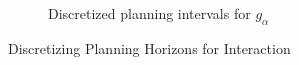 \begin{figure}[h!]
\begin{subfigure}[t]{0.5\textwidth}
\begin{tikzpicture}
\end{tikzpicture}
  \caption{Discretized planning intervals for $g_{\alpha}$}
\end{subfigure}
\caption{Discretizing Planning Horizons for Interaction}
\label{fig:disc}
\end{figure}
